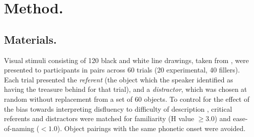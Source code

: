 \documentclass[man]{apa6}
\begin{document}
\section{Method.}
\subsection{Materials.}
Visual stimuli consisting of 120 black and white line drawings, taken from \citet{Snodgrass1980}, were presented to participants in pairs across 60 trials (20 experimental, 40 fillers). 
Each trial presented the \textit{referent} (the object which the speaker identified as having the treasure behind for that trial), and a \textit{distractor}, which was chosen at random without replacement from a set of 60 objects. 
To control for the effect of the bias towards interpreting disfluency to difficulty of description \citep{Arnold2007}, critical referents and distractors were matched for familiarity (H value $\ge 3.0$) and ease-of-naming ($<1.0$). 
Object pairings with the same phonetic onset were avoided. \\
\end{document}
